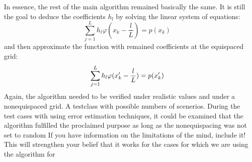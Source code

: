 \documentclass{article}
\begin{document}
In essence, the rest of the main algorithm remained basically the same.
It is still the goal to deduce the coefficients $h_{l}$ by solving the linear system of equations: 
\begin{equation}
\sum\limits_{j=1}^L h_{l}\varphi(x_{k}-\frac{l}{L})=p(x_{k})
\end{equation}
and then approximate the function with remained coefficients at the equispaced grid: 
\begin{equation}
 \sum\limits_{j=1}^L h_{l}\varphi(x'_{k}-\frac{l}{L})=p(x'_{k})\notag
\end{equation}
Again, the algorithm needed to be verified under realistic values and under a nonequispaced grid. A testclass with possible numbers of scenerios. 
During the test cases with using error estimation techniques, it could be examined that the algorithm fulfilled the proclaimed purpose as long as the nonequispacing was not set to random {\color{red} If you have information on the limitations of the mind, include it! This will strengthen your belief that it works for the cases for which we are using the algorithm for}
\cite{Peter2011}
\cite{Mungur1969}
\printbibliography
\end{document}
